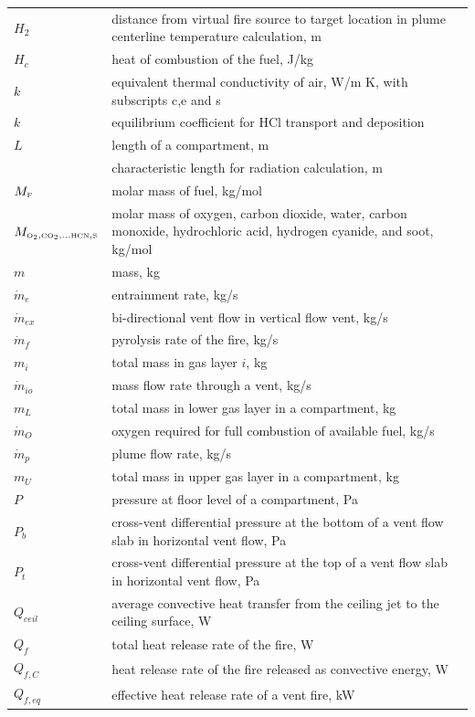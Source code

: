 \documentclass[12pt]{book}
\begin{document}
\begin{center}
\begin{longtable}{p{1in}  p{5.5 in}}
 $H_2$ & distance from virtual fire source to target location in plume centerline temperature calculation, m \\
 $H_c$ & heat of combustion of the fuel, J/kg \\
 $k$ & equivalent thermal conductivity of air, W/m K, with subscripts c,e and s \\
 $k$ & equilibrium coefficient for HCl transport and deposition \\
 $L$ & length of a compartment, m \\
  & characteristic length for radiation calculation, m \\
 $M_{\tiny \hbox{F}}$ & molar mass of fuel, kg/mol \\
 $M_{{\tiny \hbox{O}_2}, {\tiny \hbox{CO}_2}, ... {\tiny \hbox{HCN}}, {\tiny \hbox{S}}}$ & molar mass of oxygen, carbon dioxide, water, carbon monoxide, hydrochloric acid, hydrogen cyanide, and soot, kg/mol \\
 $m$ & mass, kg \\
 $\dot{m}_e$ & entrainment rate, kg/s \\
 $\dot{m}_{ex}$ & bi-directional vent flow in vertical flow vent, kg/s \\
 $\dot{m}_f$ & pyrolysis rate of the fire, kg/s \\
 $m_i$ & total mass in gas layer $i$, kg \\
 $\dot{m}_{io}$ & mass flow rate through a vent, kg/s \\
 $m_L$ & total mass in lower gas layer in a compartment, kg \\
 $\dot{m}_O$ & oxygen required for full combustion of available fuel, kg/s \\
 $\dot{m}_p$ & plume flow rate, kg/s \\
 $m_U$ & total mass in upper gas layer in a compartment, kg \\
 $P$ & pressure at floor level of a compartment, Pa \\
 $P_b$ & cross-vent differential pressure at the bottom of a vent flow slab in horizontal vent flow, Pa \\
 $P_t$ & cross-vent differential pressure at the top of a vent flow slab in horizontal vent flow, Pa \\
 $Q_{ceil}$ & average convective heat transfer from the ceiling jet to the ceiling surface, W \\
 $Q_f$ & total heat release rate of the fire, W \\
 $Q_{f,C}$ & heat release rate of the fire released as convective energy, W \\
 $Q_{f,eq}$ & effective heat release rate of a vent fire, kW \\

\end{longtable}
\end{center}
\end{document}
